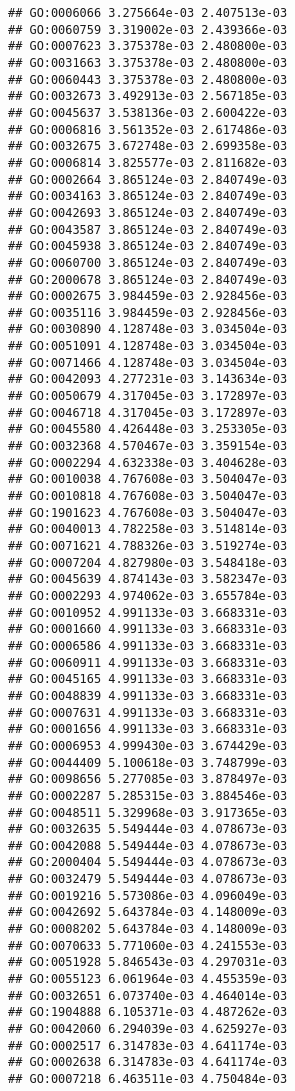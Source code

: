 \documentclass[
]{article}
\begin{document}
\begin{verbatim}
## GO:0006066 3.275664e-03 2.407513e-03
## GO:0060759 3.319002e-03 2.439366e-03
## GO:0007623 3.375378e-03 2.480800e-03
## GO:0031663 3.375378e-03 2.480800e-03
## GO:0060443 3.375378e-03 2.480800e-03
## GO:0032673 3.492913e-03 2.567185e-03
## GO:0045637 3.538136e-03 2.600422e-03
## GO:0006816 3.561352e-03 2.617486e-03
## GO:0032675 3.672748e-03 2.699358e-03
## GO:0006814 3.825577e-03 2.811682e-03
## GO:0002664 3.865124e-03 2.840749e-03
## GO:0034163 3.865124e-03 2.840749e-03
## GO:0042693 3.865124e-03 2.840749e-03
## GO:0043587 3.865124e-03 2.840749e-03
## GO:0045938 3.865124e-03 2.840749e-03
## GO:0060700 3.865124e-03 2.840749e-03
## GO:2000678 3.865124e-03 2.840749e-03
## GO:0002675 3.984459e-03 2.928456e-03
## GO:0035116 3.984459e-03 2.928456e-03
## GO:0030890 4.128748e-03 3.034504e-03
## GO:0051091 4.128748e-03 3.034504e-03
## GO:0071466 4.128748e-03 3.034504e-03
## GO:0042093 4.277231e-03 3.143634e-03
## GO:0050679 4.317045e-03 3.172897e-03
## GO:0046718 4.317045e-03 3.172897e-03
## GO:0045580 4.426448e-03 3.253305e-03
## GO:0032368 4.570467e-03 3.359154e-03
## GO:0002294 4.632338e-03 3.404628e-03
## GO:0010038 4.767608e-03 3.504047e-03
## GO:0010818 4.767608e-03 3.504047e-03
## GO:1901623 4.767608e-03 3.504047e-03
## GO:0040013 4.782258e-03 3.514814e-03
## GO:0071621 4.788326e-03 3.519274e-03
## GO:0007204 4.827980e-03 3.548418e-03
## GO:0045639 4.874143e-03 3.582347e-03
## GO:0002293 4.974062e-03 3.655784e-03
## GO:0010952 4.991133e-03 3.668331e-03
## GO:0001660 4.991133e-03 3.668331e-03
## GO:0006586 4.991133e-03 3.668331e-03
## GO:0060911 4.991133e-03 3.668331e-03
## GO:0045165 4.991133e-03 3.668331e-03
## GO:0048839 4.991133e-03 3.668331e-03
## GO:0007631 4.991133e-03 3.668331e-03
## GO:0001656 4.991133e-03 3.668331e-03
## GO:0006953 4.999430e-03 3.674429e-03
## GO:0044409 5.100618e-03 3.748799e-03
## GO:0098656 5.277085e-03 3.878497e-03
## GO:0002287 5.285315e-03 3.884546e-03
## GO:0048511 5.329968e-03 3.917365e-03
## GO:0032635 5.549444e-03 4.078673e-03
## GO:0042088 5.549444e-03 4.078673e-03
## GO:2000404 5.549444e-03 4.078673e-03
## GO:0032479 5.549444e-03 4.078673e-03
## GO:0019216 5.573086e-03 4.096049e-03
## GO:0042692 5.643784e-03 4.148009e-03
## GO:0008202 5.643784e-03 4.148009e-03
## GO:0070633 5.771060e-03 4.241553e-03
## GO:0051928 5.846543e-03 4.297031e-03
## GO:0055123 6.061964e-03 4.455359e-03
## GO:0032651 6.073740e-03 4.464014e-03
## GO:1904888 6.105371e-03 4.487262e-03
## GO:0042060 6.294039e-03 4.625927e-03
## GO:0002517 6.314783e-03 4.641174e-03
## GO:0002638 6.314783e-03 4.641174e-03
## GO:0007218 6.463511e-03 4.750484e-03

\end{verbatim}
\end{document}
